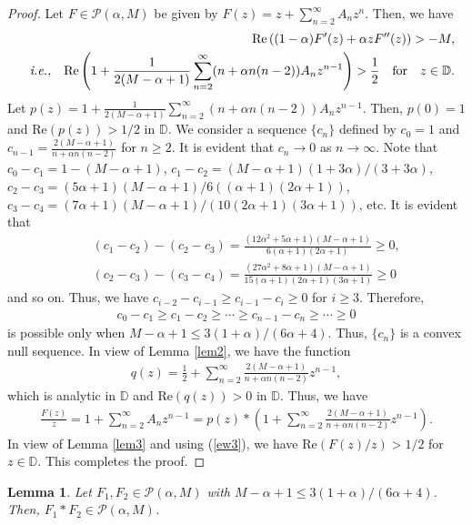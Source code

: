 \documentclass[11pt,reqno]{amsart}
\newtheorem{lem}{Lemma}[section]
\newtheorem{open problem}{Open problem}[section]
\newcommand{\beas}{\begin{eqnarray*}}
\newcommand{\eeas}{\end{eqnarray*}}
\newcommand{\bea}{\begin{eqnarray}}
\newcommand{\eea}{\end{eqnarray}}
\numberwithin{equation}{section}
\begin{document}
\begin{proof} Let $F\in\mathcal{P}(\alpha, M)$ be given by $F(z)=z+\sum_{n=2}^\infty A_nz^n$. Then, we have 
\beas &&\qquad\quad\text{Re}\left((1-\alpha)F'(z)+ \alpha zF''(z)\right)>-M,\\ 
&& \text{\it i.e.,}\quad\text{Re}\left(1+\frac{1}{2(M-\alpha+1)}\sum_{n=2}^\infty (n+\alpha n(n-2))A_nz^{n-1}\right)>\frac{1}{2}
\quad\text{for}\quad z\in\mathbb{D}.\eeas
Let $p(z)=1+\frac{1}{2(M-\alpha+1)}\sum_{n=2}^\infty (n+\alpha n(n-2))A_nz^{n-1}$. Then, $p(0)=1$ and $\text{Re}(p(z))>1/2$ in $\mathbb{D}$.
We consider a sequence $\{c_n\}$ defined by $c_0=1$ and $c_{n-1}=\frac{2(M-\alpha+1)}{n+\alpha n(n-2)}$ for $n\geq 2$. It is evident that $c_n\to 0$ as $n\to\infty$. Note that $c_0-c_1=1-(M-\alpha+1)$, $c_1-c_2=(M-\alpha+1)(1+3\alpha)/(3+3\alpha)$, $c_2-c_3=(5 \alpha +1)(M-\alpha +1)/6( (\alpha +1) (2 \alpha +1))$, $c_3-c_4=(7 \alpha +1)(M-\alpha +1)/(10 (2 \alpha +1) (3 \alpha +1))$, etc. 
It is evident that 
\beas &&(c_1-c_2)-(c_2-c_3)=\frac{\left(12 \alpha ^2+5 \alpha +1\right)(M-\alpha +1)}{6(\alpha +1) (2 \alpha +1)}\geq 0,\\
&&(c_2-c_3)-(c_3-c_4)=\frac{\left(27 \alpha ^2+8 \alpha +1\right)(M-\alpha +1)}{15(\alpha +1) (2 \alpha +1) (3 \alpha +1)}\geq 0\eeas
and so on. Thus, we have $c_{i-2}-c_{i-1}\geq c_{i-1}-c_{i}\geq 0$ for $i\geq 3$.
Therefore, 
\beas c_0-c_1\geq c_1-c_2\geq\cdots\geq c_{n-1}-c_n\geq\cdots\geq 0\eeas 
is possible only when $M-\alpha+1\leq 3(1+\alpha)/(6\alpha+4)$.
Thus, $\{c_n\}$ is a convex null sequence. In view of \textrm{Lemma \ref{lem2}}, we have the function 
\beas q(z)=\frac{1}{2}+\sum_{n=2}^\infty \frac{2(M-\alpha+1)}{n+\alpha n(n-2)}z^{n-1},\eeas
which is analytic in $\mathbb{D}$ and $\text{Re} (q(z))>0$ in $\mathbb{D}$. Thus, we have
\bea\label{ew3}\frac{F(z)}{z}=1+\sum_{n=2}^\infty A_nz^{n-1}=p(z)*\left(1+\sum_{n=2}^\infty \frac{2(M-\alpha+1)}{n+\alpha n(n-2)}z^{n-1}\right)
.\eea
In view of \textrm{Lemma \ref{lem3}} and using (\ref{ew3}), we have $\text{Re}\left(F(z)/z\right)>1/2$ for $z\in\mathbb{D}$. This completes the proof.
\end{proof}
\begin{lem}\label{lem5} Let $F_1,F_2\in\mathcal{P}(\alpha, M)$ with $M-\alpha+1\leq 3(1+\alpha)/(6\alpha+4)$. Then, $F_1*F_2\in\mathcal{P}(\alpha, M)$.\end{lem}
\end{document}
